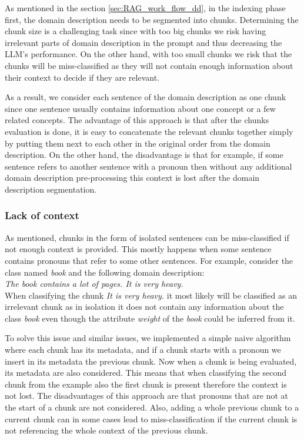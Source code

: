 As mentioned in the section \ref{sec:RAG_work_flow_dd}, in the indexing phase first, the domain description needs to be segmented into chunks. Determining the chunk size is a challenging task since with too big chunks we risk having irrelevant parts of domain description in the prompt and thus decreasing the LLM's performance. On the other hand, with too small chunks we risk that the chunks will be miss-classified as they will not contain enough information about their context to decide if they are relevant.

As a result, we consider each sentence of the domain description as one chunk since one sentence usually contains information about one concept or a few related concepts. The advantage of this approach is that after the chunks evaluation is done, it is easy to concatenate the relevant chunks together simply by putting them next to each other in the original order from the domain description. On the other hand, the disadvantage is that for example, if some sentence refers to another sentence with a pronoun then without any additional domain description pre-processing this context is lost after the domain description segmentation.


\subsubsection{Lack of context}

As mentioned, chunks in the form of isolated sentences can be miss-classified if not enough context is provided. This mostly happens when some sentence contains pronouns that refer to some other sentences. For example, consider the class named \textit{book} and the following domain description: \\

\noindent{}\textit{The book contains a lot of pages. It is very heavy.} \\

\noindent{}When classifying the chunk \textit{It is very heavy.} it most likely will be classified as an irrelevant chunk as in isolation it does not contain any information about the class \textit{book} even though the attribute \textit{weight} of the \textit{book} could be inferred from it.

To solve this issue and similar issues, we implemented a simple naive algorithm where each chunk has its metadata, and if a chunk starts with a pronoun we insert in its metadata the previous chunk. Now when a chunk is being evaluated, its metadata are also considered. This means that when classifying the second chunk from the example also the first chunk is present therefore the context is not lost. The disadvantages of this approach are that pronouns that are not at the start of a chunk are not considered. Also, adding a whole previous chunk to a current chunk can in some cases lead to miss-classification if the current chunk is not referencing the whole context of the previous chunk.

